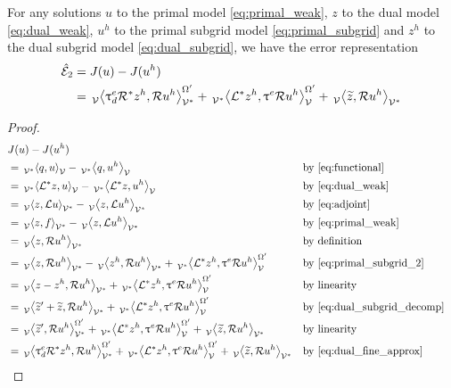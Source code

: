 \begin{prop}
For any solutions $u$ to the primal model \eqref{eq:primal_weak},
$z$ to the dual model \eqref{eq:dual_weak}, $u^h$ to the primal
subgrid model \eqref{eq:primal_subgrid} and $z^h$ to the dual
subgrid model \eqref{eq:dual_subgrid}, we have the error
representation
%
\begin{gather}
\begin{aligned}
\hat{\mathcal{E}}_2 &= J(u) - J(u^h) \\
&=
\,{}_{\mathcal{V}}^{}\!\left< {\uptau^e_d \mathcal{R}^* z^h}, {\mathcal{R} u^h} \right>_{\mathcal{V}^*}^{\Omega'} +
\,{}_{\mathcal{V}^*}^{}\!\left< {\mathcal{L}^* z^h}, {\uptau^e \mathcal{R} u^h} \right>_{\mathcal{V}}^{\Omega'} +
\,{}_{\mathcal{V}}^{}\!\left< {\widetilde{z}}, {\mathcal{R} u^h} \right>_{\mathcal{V}^*}
\end{aligned}
\label{eq:representation_2}
\end{gather}
%
\end{prop}

\begin{proof}
\begin{gather*}
\begin{aligned}
&J(u) - J(u^h) \\
&=
\paira{q}{u} - \paira{q}{u^h}
&& \text{by \eqref{eq:functional}} \\
&=
\paira{\OP^* z}{u} - \paira{\OP^* z}{u^h}
&& \text{by \eqref{eq:dual_weak}} \\
& =
\pairb{z}{\OP u} - \pairb{z}{\OP u^h}
&& \text{by \eqref{eq:adjoint}} \\
&=
\pairb{z}{f} - \pairb{z}{\OP u^h}
&& \text{by \eqref{eq:primal_weak}} \\
&=
\pairb{z}{\R u^h}
&& \text{by definition} \\
&=
\pairb{z}{\R u^h} - \pairb{z^h}{\R u^h} +
\paira{\OP^* z^h}{\uptau^e \R u^h}^{\Omega'}
&& \text{by \eqref{eq:primal_subgrid_2}} \\
&=
\pairb{z - z^h}{\R u^h} +
\paira{\OP^* z^h}{\uptau^e \R u^h}^{\Omega'}
&& \text{by linearity} \\
&=
\pairb{\tilde{z}' + \tilde{z}}{\R u^h} +
\paira{\OP^* z^h}{\uptau^e \R u^h}^{\Omega'}
&& \text{by \eqref{eq:dual_subgrid_decomp}} \\
&=
\pairb{\tilde{z}'}{\R u^h}^{\Omega'} +
\paira{\OP^* z^h}{\uptau^e \R u^h}^{\Omega'} +
\pairb{\tilde{z}}{ \R u^h}
&& \text{by linearity} \\
&=
\pairb{\uptau^e_d \R^* z^h}{\R u^h}^{\Omega'} +
\paira{\OP^* z^h}{\uptau^e \R u^h}^{\Omega'} +
\pairb{\tilde{z}}{ \R u^h}
&& \text{by \eqref{eq:dual_fine_approx}}
\end{aligned}
\end{gather*}
\end{proof}

